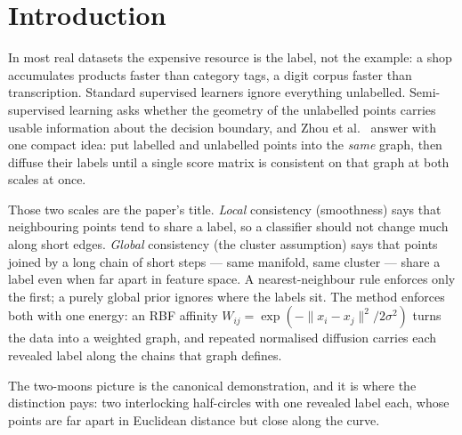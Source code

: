 \section{Introduction}\label{sec:intro}

In most real datasets the expensive resource is the label, not the example: a
shop accumulates products faster than category tags, a digit corpus faster than
transcription. Standard supervised learners ignore everything unlabelled.
Semi-supervised learning asks whether the geometry of the unlabelled points
carries usable information about the decision boundary, and Zhou
et al.~\citet{zhou2003consistency} answer with one compact idea: put labelled and
unlabelled points into the \emph{same} graph, then diffuse their labels until a
single score matrix is consistent on that graph at both scales at once.

Those two scales are the paper's title. \emph{Local} consistency (smoothness) says that
neighbouring points tend to share a label, so a classifier should not change
much along short edges. \emph{Global} consistency (the cluster assumption) says
that points joined by a long chain of short steps --- same manifold, same
cluster --- share a label even when far apart in feature space. A nearest-neighbour rule enforces only the first; a purely global prior
ignores where the labels sit. The method enforces both with one energy: an RBF
affinity $W_{ij}=\exp(-\lVert x_i-x_j\rVert^{2}/2\sigma^{2})$
turns the data into a weighted graph, and repeated normalised diffusion carries
each revealed label along the chains that graph defines.

The two-moons picture is the canonical demonstration, and it is where the
distinction pays: two interlocking half-circles with one revealed label each,
whose points are far apart in Euclidean distance but close along the curve.
